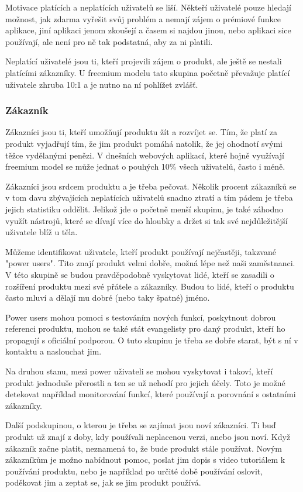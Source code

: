 \documentclass[bc,female,java,dept456]{diploma}						%
\begin{document}
Motivace platících a neplatících uživatelů se liší. Někteří uživatelé pouze hledají možnost, jak zdarma vyřešit svůj problém a nemají zájem o prémiové funkce aplikace, jiní aplikaci jenom zkoušejí a časem si najdou jinou, nebo aplikaci sice používají, ale není pro ně tak podstatná, aby za ni platili.

Neplatící uživatelé jsou ti, kteří projevili zájem o produkt, ale ještě se nestali platícími zákazníky. U freemium modelu tato skupina početně převažuje platící uživatele zhruba 10:1 a je nutno na ní pohlížet zvlášť.

\subsubsection{Zákazník}

Zákazníci jsou ti, kteří umožňují produktu žít a rozvíjet se. Tím, že platí za produkt vyjadřují tím, že jim produkt pomáhá natolik, že jej ohodnotí svými těžce vydělanými penězi. V dnešních webových aplikací, které hojně využívají freemium model se může jednat o pouhých 10\% všech uživatelů, často i méně. 

Zákazníci jsou srdcem produktu a je třeba pečovat. Několik procent zákazníků se v tom davu zbývajících neplatících uživatelů snadno ztratí a tím pádem je třeba jejich statistiku oddělit. Jelikož jde o početně menší skupinu, je také záhodno využít nástrojů, které se dívají více do hloubky a držet si tak své nejdůležitější uživatele blíž u těla. 

Můžeme identifikovat uživatele, kteří produkt používají nejčastěji, takzvané "power users". Tito znají produkt velmi dobře, možná lépe než naši zaměstnanci. V této skupině se budou pravděpodobně vyskytovat lidé, kteří se zasadili o rozšíření produktu mezi své přátele a zákazníky. Budou to lidé, kteří o produktu často mluví a dělají mu dobré (nebo taky špatné) jméno.

Power users mohou pomoci s testováním nových funkcí, poskytnout dobrou referenci produktu, mohou se také stát evangelisty pro daný produkt, kteří ho propagují s oficiální podporou. O tuto skupinu je třeba se dobře starat, být s ní v kontaktu a naslouchat jim. 

Na druhou stanu, mezi power uživateli se mohou vyskytovat i takoví, kteří produkt jednoduše přerostli a ten se už nehodí pro jejich účely. Toto je možné detekovat například monitorování funkcí, které používají a porovnání s ostatními zákazníky.

Další podskupinou, o kterou je třeba se zajímat jsou noví zákazníci. Ti buď produkt už znají z doby, kdy používali neplacenou verzi, anebo jsou noví. Když zákazník začne platit, neznamená to, že bude produkt stále používat. Novým zákazníkům je možno nabídnout pomoc, poslat jim dopis s video tutoriálem k používání produktu, nebo je například po určité době používání oslovit, poděkovat jim a zeptat se, jak se jim produkt používá.
\end{document}
